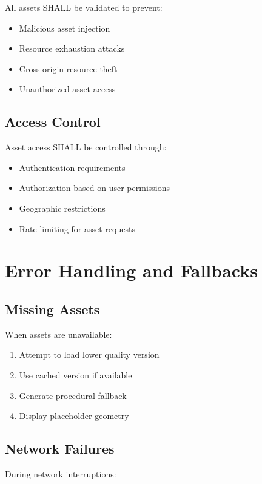 \documentclass[12pt,a4paper]{article}
\begin{document}
All assets SHALL be validated to prevent:

\begin{itemize}
\item Malicious asset injection
\item Resource exhaustion attacks
\item Cross-origin resource theft
\item Unauthorized asset access
\end{itemize}

\subsection{Access Control}

Asset access SHALL be controlled through:

\begin{itemize}
\item Authentication requirements
\item Authorization based on user permissions
\item Geographic restrictions
\item Rate limiting for asset requests
\end{itemize}

\section{Error Handling and Fallbacks}

\subsection{Missing Assets}

When assets are unavailable:

\begin{enumerate}
\item Attempt to load lower quality version
\item Use cached version if available
\item Generate procedural fallback
\item Display placeholder geometry
\end{enumerate}

\subsection{Network Failures}

During network interruptions:
\end{document}
